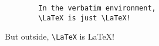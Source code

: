 \documentclass{article}
\begin{document}
    \begin{verbatim}
        In the verbatim environment,
        \LaTeX is just \LaTeX!
    \end{verbatim}

    But outside, \verb|\LaTeX| is \LaTeX!
\end{document}

